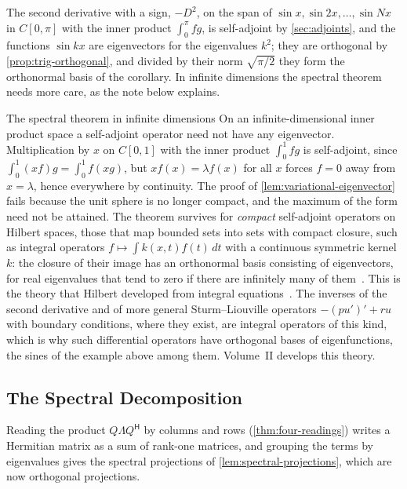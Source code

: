 The second derivative with a sign, $-D^2$, on the span of $\sin x,\sin2x,\ldots,\sin Nx$ in $C[0,\pi]$ with the inner product $\int_0^\pi fg$, is self-adjoint by \cref{sec:adjoints}, and the functions $\sin kx$ are eigenvectors for the eigenvalues $k^2$; they are orthogonal by \cref{prop:trig-orthogonal}, and divided by their norm $\sqrt{\pi/2}$ they form the orthonormal basis of the corollary. In infinite dimensions the spectral theorem needs more care, as the note below explains.

\begin{note}{The spectral theorem in infinite dimensions}
On an infinite-dimensional inner product space a self-adjoint operator need not have any eigenvector. Multiplication by $x$ on $C[0,1]$ with the inner product $\int_0^1fg$ is self-adjoint, since $\int_0^1(xf)g=\int_0^1f(xg)$, but $xf(x)=\lambda f(x)$ for all $x$ forces $f=0$ away from $x=\lambda$, hence everywhere by continuity. The proof of \cref{lem:variational-eigenvector} fails because the unit sphere is no longer compact, and the maximum of the form need not be attained. The theorem survives for \emph{compact} self-adjoint operators on Hilbert spaces, those that map bounded sets into sets with compact closure, such as integral operators $f\mapsto\int k(x,t)f(t)\,dt$ with a continuous symmetric kernel $k$: the closure of their image has an orthonormal basis consisting of eigenvectors, for real eigenvalues that tend to zero if there are infinitely many of them~\cite{kreyszig1978}. This is the theory that Hilbert developed from integral equations~\cite{hilbert1904}. The inverses of the second derivative and of more general Sturm--Liouville operators $-(pu')'+ru$ with boundary conditions, where they exist, are integral operators of this kind, which is why such differential operators have orthogonal bases of eigenfunctions, the sines of the example above among them. Volume~II develops this theory.
\end{note}

\subsection{The Spectral Decomposition}

Reading the product $Q\Lambda Q^{\mathsf H}$ by columns and rows (\cref{thm:four-readings}) writes a Hermitian matrix as a sum of rank-one matrices, and grouping the terms by eigenvalues gives the spectral projections of \cref{lem:spectral-projections}, which are now orthogonal projections.


